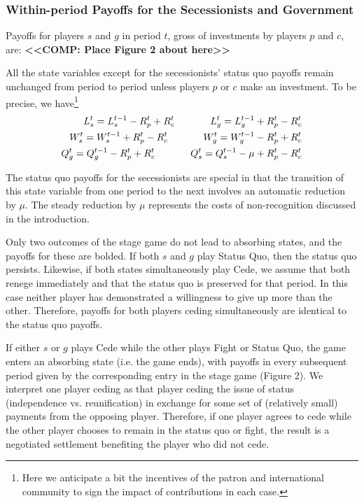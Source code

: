 \subsubsection{Within-period Payoffs for the Secessionists and Government}
\label{sec:stage}

\noindent Payoffs for players $s$ and $g$ in period $t$, gross of investments by players $p$ and $c$, are:
\vspace{2pt}
\textbf{<<COMP: Place Figure 2 about here>>}
\vspace{2.5pt}

All the state variables except for the secessionists' status quo payoffs remain unchanged from period to period unless players $p$ or $c$ make an investment. To be precise, we have\footnote{Here we anticipate a bit the incentives of the patron and international community to sign the impact of contributions in each case.}
	\begin{equation}
	\begin{aligned}
		L_s^t = L_s^{t-1} - R_p^t + R_c^t \hskip.5in L_g^t = L_g^{t-1} + R_p^t - R_c^t \\
		W_s^t = W_s^{t-1} + R_p^t - R_c^t \hskip.5in W_g^t = W_g^{t-1} - R_p^t + R_c^t \\
		Q_g^t = Q_g^{t-1} - R_p^t + R_c^t \hskip.5in Q_s^t = Q_s^{t-1} - \mu + R_p^t - R_c^t
		\label{eqn:motion}
	\end{aligned}
	\end{equation}
	

The status quo payoffs for the secessionists are special in that the transition of this state variable from one period to the next involves an automatic reduction by $\mu$. The steady reduction by $\mu$ represents the costs of non-recognition discussed in the introduction.

Only two outcomes of the stage game do not lead to absorbing states, and the payoffs for these are bolded. If both $s$ and $g$ play Status Quo, then the status quo persists. Likewise, if both states simultaneously play Cede, we assume that both renege immediately and that the status quo is preserved for that period. In this case neither player has demonstrated a willingness to give up more than the other. Therefore, payoffs for both players ceding simultaneously are identical to the status quo payoffs.%

If either $s$ or $g$ plays Cede while the other plays Fight or Status Quo, the game enters an absorbing state (i.e. the game ends), with payoffs in every subsequent period given by the corresponding entry in the stage game (Figure 2). We interpret one player ceding as that player ceding the issue of status (independence vs. reunification) in exchange for some set of (relatively small) payments from the opposing player. Therefore, if one player agrees to cede while the other player chooses to remain in the status quo or fight, the result is a negotiated settlement benefiting the player who did not cede. 

